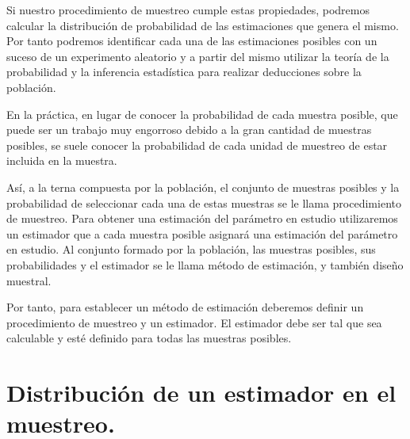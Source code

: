Si nuestro procedimiento de muestreo cumple estas propiedades, podremos calcular la distribuci\'on de probabilidad de las estimaciones que genera el mismo. Por tanto podremos identificar cada una de las estimaciones posibles con un suceso de un experimento aleatorio y a partir del mismo utilizar la teor\'ia de la probabilidad y la inferencia estad\'istica para realizar deducciones sobre la poblaci\'on.

En la pr\'actica, en lugar de conocer la probabilidad de cada muestra posible, que puede ser un trabajo muy engorroso debido a la gran cantidad de muestras posibles, se suele conocer la probabilidad de cada unidad de muestreo de estar incluida en la muestra.

As\'i, a la terna compuesta por la poblaci\'on, el conjunto de muestras posibles y la probabilidad de seleccionar cada una de estas muestras se le llama procedimiento de muestreo. Para obtener una estimaci\'on del par\'ametro en estudio utilizaremos un estimador que a cada muestra posible asignar\'a una estimaci\'on del par\'ametro en estudio. Al conjunto formado por la poblaci\'on, las muestras posibles, sus probabilidades y el estimador se le llama m\'etodo de estimaci\'on, y tambi\'en dise\~no muestral.

Por tanto, para establecer un m\'etodo de estimaci\'on deberemos definir un procedimiento de muestreo y un estimador. El estimador debe ser tal que sea calculable y est\'e definido para todas las muestras posibles. 

\section{Distribuci\'on de un estimador en el muestreo.}
